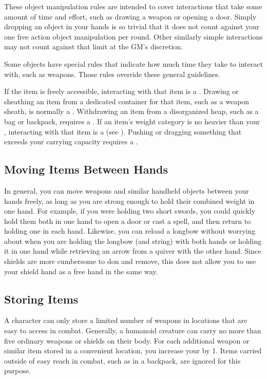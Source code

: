     These object manipulation rules are intended to cover interactions that take some amount of time and effort, such as drawing a weapon or opening a door.
    Simply dropping an object in your hands is so trivial that it does not count against your one free action object manipulation per round.
    Other similarly simple interactions may not count against that limit at the GM's discretion.

    Some objects have special rules that indicate how much time they take to interact with, such as  weapons.
    Those rules override these general guidelines.

    \begin{raggeditemize}
       If the item is freely accessible, interacting with that item is a .
        Drawing or sheathing an item from a dedicated container for that item, such as a weapon sheath, is normally a .
        Withdrawing an item from a disorganized heap, such as a bag or backpack, requires a .
       If an item's weight category is no heavier than your , interacting with that item is a  (see ).
        Pushing or dragging something that exceeds your carrying capacity requires a .
    \end{raggeditemize}

  \subsection{Moving Items Between Hands}\label{Moving Items Between Hands}
    In general, you can move weapons and similar handheld objects between your hands freely, as long as you are strong enough to hold their combined weight in one hand.
    For example, if you were holding two short swords, you could quickly hold them both in one hand to open a door or cast a spell, and then return to holding one in each hand.
    Likewise, you can reload a longbow without worrying about when you are holding the longbow (and string) with both hands or holding it in one hand while retrieving an arrow from a quiver with the other hand.
    Since shields are more cumbersome to don and remove, this does not allow you to use your shield hand as a free hand in the same way.

  \subsection{Storing Items}\label{Storing Items}
    A character can only store a limited number of weapons in locations that are easy to access in combat.
    Generally, a humanoid creature can carry no more than five ordinary weapons or shields on their body.
    For each additional weapon or similar item stored in a convenient location, you increase your  by 1.
    Items carried outside of easy reach in combat, such as in a backpack, are ignored for this purpose.

